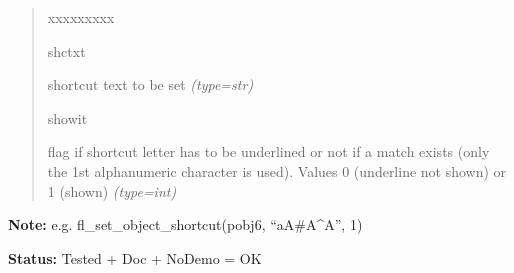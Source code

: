 \begin{boxedminipage}{\funcwidth}
\begin{quote}
\begin{Ventry}{xxxxxxxxx}
          \item[shctxt]


shortcut text to be set
            {\it (type=str)}

          \item[showit]


flag if shortcut letter has to be underlined or not if a match exists
(only the 1st alphanumeric character is used). Values 0 (underline not
shown) or 1 (shown)
            {\it (type=int)}

        \end{Ventry}

      \end{quote}

\textbf{Note:} 
e.g. fl\_set\_object\_shortcut(pobj6, ``aA\#A\textasciicircum{}A'', 1)


\textbf{Status:} 
Tested + Doc + NoDemo = OK


    \end{boxedminipage}

    \label{xformslib:flbutton:fl_create_generic_button}

    \vspace{0.5ex}

